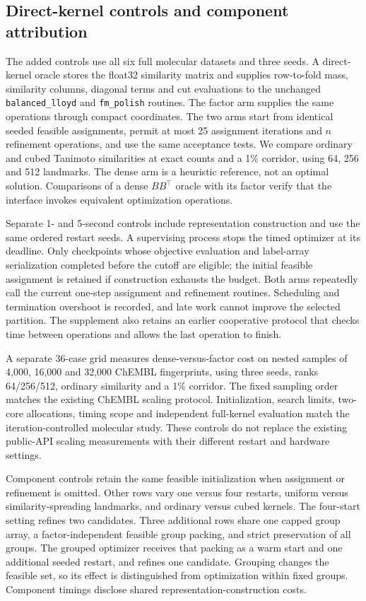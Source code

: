\subsection{Direct-kernel controls and component attribution}

The added controls use all six full molecular datasets and three seeds. A
direct-kernel oracle stores the float32 similarity matrix and supplies row-to-fold
mass, similarity columns, diagonal terms and cut evaluations to the unchanged
\texttt{balanced\_lloyd} and \texttt{fm\_polish} routines. The factor arm supplies
the same operations through compact coordinates. The two arms start from
identical seeded feasible assignments, permit at most 25 assignment iterations
and $n$ refinement operations, and use the same acceptance tests. We compare
ordinary and cubed Tanimoto similarities at exact counts and a 1\% corridor,
using 64, 256 and 512 landmarks. The dense arm is a heuristic reference, not an
optimal solution. Comparisons of a dense $BB^\top$ oracle with its factor verify
that the interface invokes equivalent optimization operations.

Separate 1- and 5-second controls include representation construction and use
the same ordered restart seeds. A supervising process stops the timed optimizer
at its deadline. Only checkpoints whose objective evaluation and label-array
serialization completed before the cutoff are eligible; the initial feasible
assignment is retained if construction exhausts the budget. Both arms repeatedly
call the current one-step assignment and refinement routines. Scheduling and
termination overshoot is recorded, and late work cannot improve the selected
partition. The supplement also retains an earlier cooperative protocol that
checks time between operations and allows the last operation to finish.

A separate 36-case grid measures dense-versus-factor cost on nested samples of
4,000, 16,000 and 32,000 ChEMBL fingerprints, using three seeds, ranks
64/256/512, ordinary similarity and a 1\% corridor. The fixed sampling order
matches the existing ChEMBL scaling protocol. Initialization, search limits,
two-core allocations, timing scope and independent full-kernel evaluation
match the iteration-controlled molecular study. These controls do not replace
the existing public-API scaling measurements with their different restart and
hardware settings.

Component controls retain the same feasible initialization when assignment or
refinement is omitted. Other rows vary one versus four restarts, uniform versus
similarity-spreading landmarks, and ordinary versus cubed kernels. The four-start
setting refines two candidates. Three additional rows share one capped group
array, a factor-independent feasible group packing, and strict preservation of
all groups. The grouped optimizer receives that packing as a warm start and one
additional seeded restart, and refines one candidate. Grouping changes the
feasible set, so its effect is distinguished from optimization within fixed
groups. Component timings disclose shared representation-construction costs.

